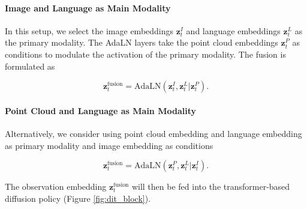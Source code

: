 \paragraph{Image and Language as Main Modality}
In this setup, we select the image embeddings $\mathbf{z}_t^I$ and language embeddings $\mathbf{z}_t^L$ as the primary modality. The AdaLN layers take the point cloud embeddings $\mathbf{z}_t^P$ as conditions to modulate the activation of the primary modality. The fusion is formulated as

\begin{equation}
    \mathbf{z}_t^{\text{fusion}} =  \text{AdaLN}(\mathbf{z}_t^I, \mathbf{z}_t^L | \mathbf{z}_t^P).
\end{equation}

\paragraph{Point Cloud and Language as Main Modality}
Alternatively, we consider using point cloud embedding and language embedding as primary modality and image embedding as conditions

\begin{equation}
    \mathbf{z}_t^{\text{fusion}} =  \text{AdaLN}(\mathbf{z}_t^P, \mathbf{z}_t^L | \mathbf{z}_t^I).
\end{equation}

The observation embedding \(\mathbf{z}_t^{\text{fusion}}\) will then be fed into the transformer-based diffusion policy (Figure \ref{fig:dit_block}).

